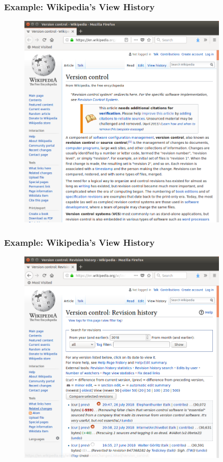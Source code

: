 \documentclass{beamer}
\begin{document}
\begin{frame}
   \frametitle{Example: Wikipedia's View History}
   \begin{figure}[htbp]
      \includegraphics[width=0.9\textwidth]{images/version-control-wikipedia.png}
   \end{figure}
\end{frame}

\begin{frame}
   \frametitle{Example: Wikipedia's View History}
   \begin{figure}[htbp]
      \includegraphics[width=0.9\textwidth]{images/revision-history-wikipedia.png}
   \end{figure}
\end{frame}
\end{document}
